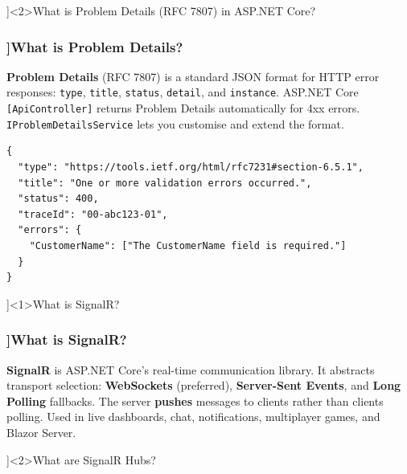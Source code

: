 \QuestionSlide[\CategoryBadge[RestColor!20]{REST \& SignalR}]<2>{What is Problem Details (RFC 7807) in ASP.NET Core?}

\begin{frame}[fragile]
  \frametitle{\AnswerTitle[\CategoryBadge[RestColor!20]{REST \& SignalR}]{What is Problem Details?}}

  {\footnotesize
  \textbf{Problem Details} (RFC 7807) is a standard JSON format for HTTP error responses: \texttt{type}, \texttt{title}, \texttt{status}, \texttt{detail}, and \texttt{instance}. ASP.NET Core \texttt{[ApiController]} returns Problem Details automatically for 4xx errors. \texttt{IProblemDetailsService} lets you customise and extend the format.
  }

  \begin{verbatim}
{
  "type": "https://tools.ietf.org/html/rfc7231#section-6.5.1",
  "title": "One or more validation errors occurred.",
  "status": 400,
  "traceId": "00-abc123-01",
  "errors": {
    "CustomerName": ["The CustomerName field is required."]
  }
}
  \end{verbatim}
\end{frame}

\QuestionSlide[\CategoryBadge[RestColor!20]{REST \& SignalR}]<1>{What is SignalR?}

\begin{frame}[fragile]
  \frametitle{\AnswerTitle[\CategoryBadge[RestColor!20]{REST \& SignalR}]{What is SignalR?}}

  {\footnotesize
  \textbf{SignalR} is ASP.NET Core's real-time communication library. It abstracts transport selection: \textbf{WebSockets} (preferred), \textbf{Server-Sent Events}, and \textbf{Long Polling} fallbacks. The server \textbf{pushes} messages to clients rather than clients polling. Used in live dashboards, chat, notifications, multiplayer games, and Blazor Server.
  }
\end{frame}

\QuestionSlide[\CategoryBadge[RestColor!20]{REST \& SignalR}]<2>{What are SignalR Hubs?}

